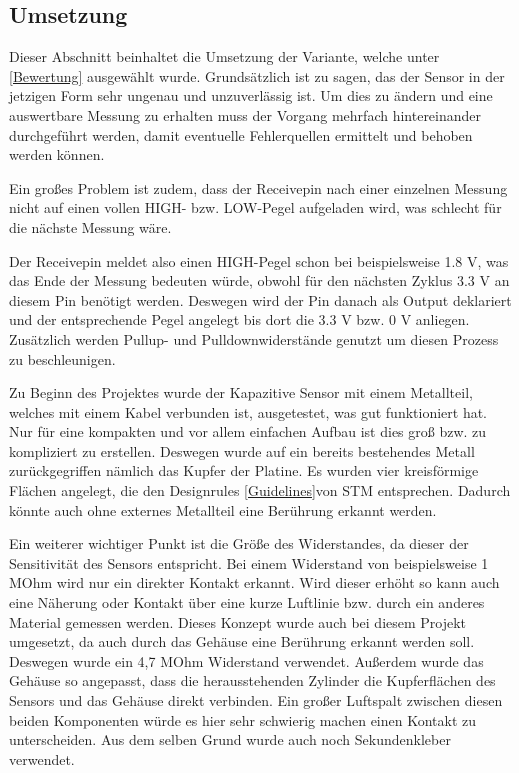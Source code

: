 \documentclass[a4paper,
DIV=13,
12pt,
BCOR=10mm,
department=FakEI,
parskip=half,
automark,
]{article}
\begin{document}
\subsection{Umsetzung}
Dieser Abschnitt beinhaltet die Umsetzung der Variante, welche unter \ref{Bewertung} ausgewählt wurde. Grundsätzlich ist zu sagen, das der Sensor in der jetzigen Form sehr ungenau und unzuverlässig ist. Um dies zu ändern und eine auswertbare Messung zu erhalten muss der Vorgang mehrfach hintereinander durchgeführt werden, damit eventuelle Fehlerquellen ermittelt und behoben werden können. 

Ein großes Problem ist zudem, dass der Receivepin nach einer einzelnen Messung nicht auf einen vollen HIGH- bzw. LOW-Pegel aufgeladen wird, was schlecht für die nächste Messung wäre.

Der Receivepin meldet also einen HIGH-Pegel schon bei beispielsweise 1.8 V, was das Ende der Messung bedeuten würde, obwohl für den nächsten Zyklus 3.3 V an diesem Pin benötigt werden. Deswegen wird der Pin danach als Output deklariert und der entsprechende Pegel angelegt bis dort die 3.3 V bzw. 0 V anliegen. Zusätzlich werden Pullup- und Pulldownwiderstände genutzt um diesen Prozess zu beschleunigen. 

Zu Beginn des Projektes wurde der Kapazitive Sensor mit einem Metallteil, welches mit einem Kabel verbunden ist, ausgetestet, was gut funktioniert hat. Nur für eine kompakten und vor allem einfachen Aufbau ist dies groß bzw. zu kompliziert zu erstellen. Deswegen wurde auf ein bereits bestehendes Metall zurückgegriffen nämlich das Kupfer der Platine. Es wurden vier kreisförmige Flächen angelegt, die den Designrules \ref{Guidelines}von STM entsprechen. Dadurch könnte auch ohne externes Metallteil eine Berührung erkannt werden.

Ein weiterer wichtiger Punkt ist die Größe des Widerstandes, da dieser der Sensitivität des Sensors entspricht. Bei einem Widerstand von beispielsweise 1 MOhm wird nur ein direkter Kontakt erkannt. Wird dieser erhöht so kann auch eine Näherung oder Kontakt über eine kurze Luftlinie bzw. durch ein anderes Material gemessen werden. Dieses Konzept wurde auch bei diesem Projekt umgesetzt, da auch durch das Gehäuse eine Berührung erkannt werden soll. Deswegen wurde ein 4,7 MOhm Widerstand verwendet. Außerdem wurde das Gehäuse so angepasst, dass die herausstehenden Zylinder die Kupferflächen des Sensors und das Gehäuse direkt verbinden. Ein großer Luftspalt zwischen diesen beiden Komponenten würde es hier sehr schwierig machen einen Kontakt zu unterscheiden. Aus dem selben Grund wurde auch noch Sekundenkleber verwendet. 
\end{document}
